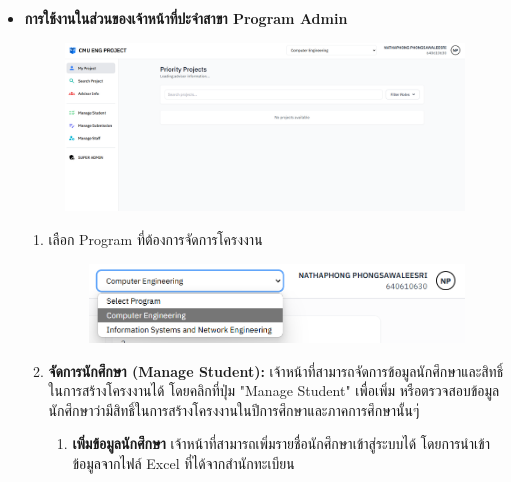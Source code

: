 \begin{itemize}
\begin{enumerate}
\begin{figure}[H]
    \end{figure} 
\end{enumerate}
\item \textbf{การใช้งานในส่วนของเจ้าหน้าที่ปะจำสาขา Program Admin}
\begin{figure}[H]
    \centering
    \includegraphics[width=130mm, keepaspectratio ]{pictures/project_box/program_admin_dashboard.png}
\end{figure}
\begin{enumerate}
    \item เลือก Program ที่ต้องการจัดการโครงงาน
    \begin{figure}[H]
        \centering
        \includegraphics[width=130mm, keepaspectratio ]{pictures/project_box/select_program_before_manage.png}
    \end{figure}
    \item \textbf{จัดการนักศึกษา (Manage Student): } เจ้าหน้าที่สามารถจัดการข้อมูลนักศึกษาและสิทธิ์ในการสร้างโครงงานได้ โดยคลิกที่ปุ่ม "Manage Student" เพื่อเพิ่ม หรือตรวจสอบข้อมูลนักศึกษาว่ามีสิทธิ์ในการสร้างโครงงานในปีการศึกษาและภาคการศึกษานั้นๆ่
    \begin{enumerate}
        \item \textbf{เพิ่มข้อมูลนักศึกษา} เจ้าหน้าที่สามารถเพิ่มรายชื่อนักศึกษาเข้าสู่ระบบได้ โดยการนำเข้าข้อมูลจากไฟล์ Excel ที่ได้จากสำนักทะเบียน
        \begin{figure}[H]
            \centering

\end{figure}
\end{enumerate}
\end{enumerate}
\end{itemize}
